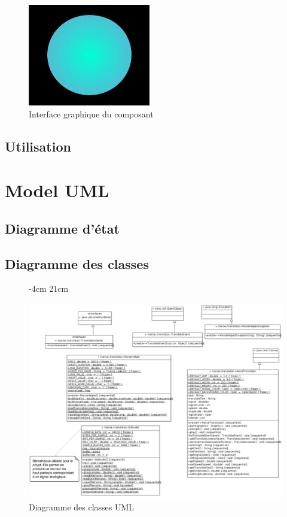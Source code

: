 \documentclass[a4paper,11pt]{article}
\begin{document}
	\begin{figure}[H]
		\begin{center}
			\includegraphics[scale=0.5]{comdescpicture.jpg}
			\caption{Interface graphique du composant}
			\label{Interface graphique du composant}
		\end{center}
	\end{figure}
    \subsection{Utilisation}
    

    \section{Model UML}
    \subsection{Diagramme d'état}
    \subsection{Diagramme des classes}
    \begin{figure}[H]
    	 -4cm 21cm
    	\begin{center}
    		\includegraphics[scale=0.6]{classdiag.png}
    		\caption{Diagramme des classes UML}
    		\label{Diagramme des classes UML}
    	\end{center}
    \end{figure}
\end{document}
